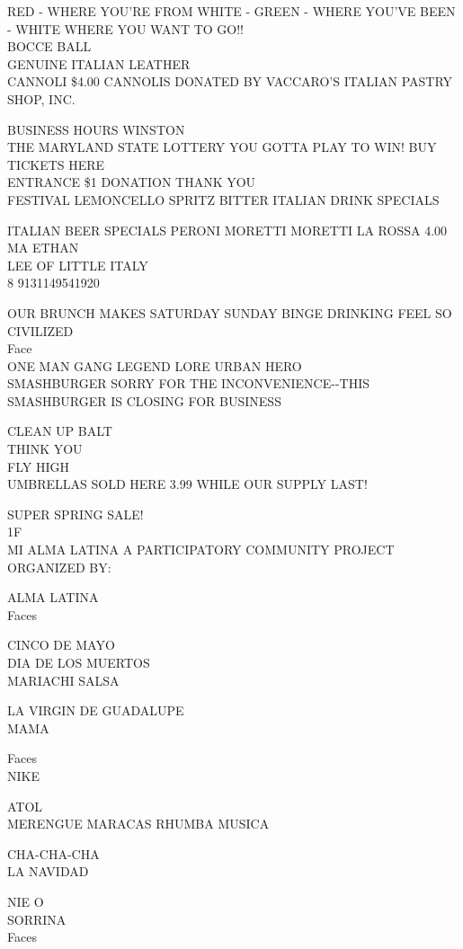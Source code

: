 \documentclass[10pt,letterpaper]{article}
\begin{document}
RED {-} WHERE YOU'RE FROM WHITE {-} GREEN {-} WHERE YOU'VE BEEN {-} WHITE WHERE YOU WANT TO GO!!\\
BOCCE BALL\\
GENUINE ITALIAN LEATHER\\
CANNOLI \$4.00 CANNOLIS DONATED BY VACCARO'S ITALIAN PASTRY SHOP, INC.

BUSINESS HOURS WINSTON\\
THE MARYLAND STATE LOTTERY YOU GOTTA PLAY TO WIN!  BUY TICKETS HERE\\
ENTRANCE \$1 DONATION THANK YOU\\
FESTIVAL LEMONCELLO SPRITZ BITTER ITALIAN DRINK SPECIALS

ITALIAN BEER SPECIALS PERONI MORETTI MORETTI LA ROSSA 4.00\\
MA ETHAN\\
LEE OF LITTLE ITALY\\
8 9131149541920

OUR BRUNCH MAKES SATURDAY SUNDAY BINGE DRINKING FEEL SO CIVILIZED\\
Face\\
ONE MAN GANG LEGEND LORE URBAN HERO\\
SMASHBURGER SORRY FOR THE INCONVENIENCE{-}{-}THIS SMASHBURGER IS CLOSING FOR BUSINESS

CLEAN UP BALT\\
THINK YOU\\
FLY HIGH\\
UMBRELLAS SOLD HERE 3.99 WHILE OUR SUPPLY LAST!

SUPER SPRING SALE!\\
1F\\
MI ALMA LATINA A PARTICIPATORY COMMUNITY PROJECT ORGANIZED BY:

ALMA LATINA\\
Faces

CINCO DE MAYO\\
DIA DE LOS MUERTOS\\
MARIACHI SALSA

LA VIRGIN DE GUADALUPE\\
MAMA

Faces\\
NIKE

ATOL\\
MERENGUE MARACAS RHUMBA MUSICA

CHA{-}CHA{-}CHA\\
LA NAVIDAD

NIE O\\
SORRINA\\
Faces
\end{document}
